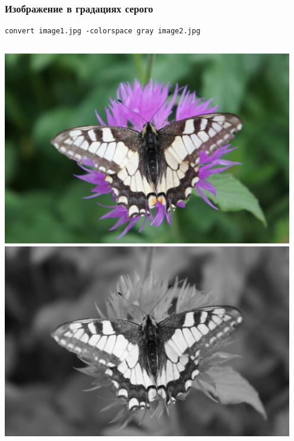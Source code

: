 \documentclass[11pt, compress]{beamer}
\begin{document}
\begin{frame}[c, fragile]
\frametitle{Изображение в градациях серого}
\begin{lstlisting}
convert image1.jpg -colorspace gray image2.jpg
\end{lstlisting}
\begin{columns}
\center
\includegraphics[width=0.95\textwidth]{FLY1000.jpg}
\center
\includegraphics[width=0.95\textwidth]{FLY1000_grayscale.jpg}
\end{columns}
\end{frame}
\end{document}
